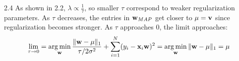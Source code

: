 \documentclass[submit]{harvardml}
\DeclareMathOperator*{\argmin}{arg\,min}
\begin{document}
2.4  As shown in 2.2, $\lambda \propto \frac{1}{\tau}$, so smaller $\tau$ correspond to weaker regularization parameters. As $\tau$ decreases, the entries in $\bold{w}_{MAP}$ get closer to $\mu = \bold{v}$ since regularization becomes stronger. As $\tau$ approaches 0, the limit approaches:
$$\lim_{\tau \rightarrow 0} = \argmin_{\bold{w}}  \frac{\|\mathbf{w}-\mathbf{\mu}\|_1}{\tau/2\sigma^2} + \sum_{i=1}^N (y_i - \bold{x}_i\bold{w})^2 = \argmin_{\bold{w}} {\| \bold{w} - \mu\|_1} = \mu$$




\newpage
\end{document}
